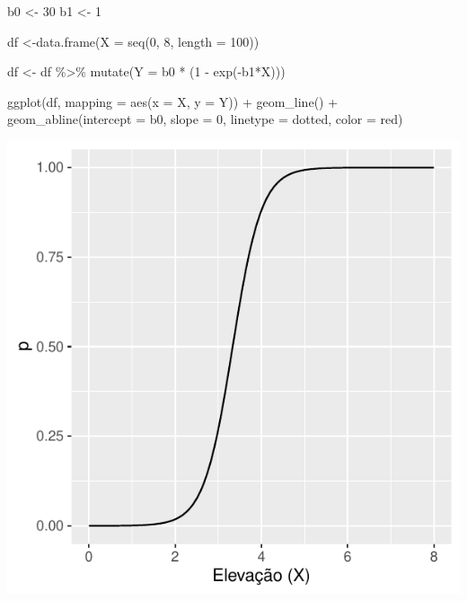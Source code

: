 \documentclass[
]{book}
\newenvironment{Shaded}{\begin{snugshade}}{\end{snugshade}}
\newcommand{\AttributeTok}[1]{\textcolor[rgb]{0.77,0.63,0.00}{#1}}
\newcommand{\DecValTok}[1]{\textcolor[rgb]{0.00,0.00,0.81}{#1}}
\newcommand{\FunctionTok}[1]{\textcolor[rgb]{0.00,0.00,0.00}{#1}}
\newcommand{\NormalTok}[1]{#1}
\newcommand{\OtherTok}[1]{\textcolor[rgb]{0.56,0.35,0.01}{#1}}
\newcommand{\SpecialCharTok}[1]{\textcolor[rgb]{0.00,0.00,0.00}{#1}}
\newcommand{\StringTok}[1]{\textcolor[rgb]{0.31,0.60,0.02}{#1}}
\begin{document}
\begin{Shaded}
\begin{Highlighting}[]
\NormalTok{b0 }\OtherTok{\textless{}{-}} \DecValTok{30}
\NormalTok{b1 }\OtherTok{\textless{}{-}} \DecValTok{1}

\NormalTok{df }\OtherTok{\textless{}{-}}\FunctionTok{data.frame}\NormalTok{(}\AttributeTok{X =} \FunctionTok{seq}\NormalTok{(}\DecValTok{0}\NormalTok{, }\DecValTok{8}\NormalTok{, }\AttributeTok{length =} \DecValTok{100}\NormalTok{))}

\NormalTok{df }\OtherTok{\textless{}{-}}\NormalTok{ df }\SpecialCharTok{\%\textgreater{}\%} \FunctionTok{mutate}\NormalTok{(}\AttributeTok{Y =}\NormalTok{ b0 }\SpecialCharTok{*}\NormalTok{ (}\DecValTok{1} \SpecialCharTok{{-}} \FunctionTok{exp}\NormalTok{(}\SpecialCharTok{{-}}\NormalTok{b1}\SpecialCharTok{*}\NormalTok{X)))}

\FunctionTok{ggplot}\NormalTok{(df, }\AttributeTok{mapping =} \FunctionTok{aes}\NormalTok{(}\AttributeTok{x =}\NormalTok{ X, }\AttributeTok{y =}\NormalTok{ Y)) }\SpecialCharTok{+}
  \FunctionTok{geom\_line}\NormalTok{() }\SpecialCharTok{+}
  \FunctionTok{geom\_abline}\NormalTok{(}\AttributeTok{intercept =}\NormalTok{ b0, }\AttributeTok{slope =} \DecValTok{0}\NormalTok{, }\AttributeTok{linetype =} \StringTok{\textquotesingle{}dotted\textquotesingle{}}\NormalTok{, }\AttributeTok{color =} \StringTok{\textquotesingle{}red\textquotesingle{}}\NormalTok{)}
\end{Highlighting}
\end{Shaded}

\begin{center}\includegraphics{probest-cambientais_files/figure-latex/unnamed-chunk-231-1} \end{center}
\end{document}
